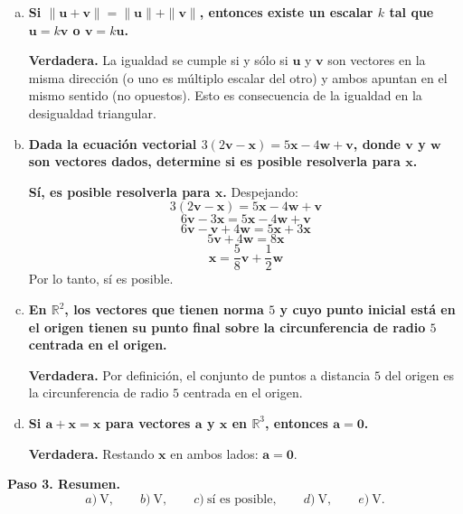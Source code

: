 \begin{prob}
\begin{myproof}
\begin{enumerate}[a)]
\item \textbf{Si $\|\mathbf{u}+\mathbf{v}\|=\|\mathbf{u}\|+\|\mathbf{v}\|$, entonces existe un escalar $k$ tal que $\mathbf{u}=k\mathbf{v}$ o $\mathbf{v}=k\mathbf{u}$.}

\textbf{Verdadera.}  
La igualdad se cumple si y sólo si $\mathbf{u}$ y $\mathbf{v}$ son vectores en la misma dirección (o uno es múltiplo escalar del otro) y ambos apuntan en el mismo sentido (no opuestos).  
Esto es consecuencia de la igualdad en la desigualdad triangular.

\item \textbf{Dada la ecuación vectorial $3(2\mathbf{v}-\mathbf{x})=5\mathbf{x}-4\mathbf{w}+\mathbf{v}$, donde $\mathbf{v}$ y $\mathbf{w}$ son vectores dados, determine si es posible resolverla para $\mathbf{x}$.}

\textbf{Sí, es posible resolverla para $\mathbf{x}$.}  
Despejando:
\[
3(2\mathbf{v}-\mathbf{x}) = 5\mathbf{x} - 4\mathbf{w} + \mathbf{v}
\]
\[
6\mathbf{v} - 3\mathbf{x} = 5\mathbf{x} - 4\mathbf{w} + \mathbf{v}
\]
\[
6\mathbf{v} - \mathbf{v} + 4\mathbf{w} = 5\mathbf{x} + 3\mathbf{x}
\]
\[
5\mathbf{v} + 4\mathbf{w} = 8\mathbf{x}
\]
\[
\mathbf{x} = \frac{5}{8}\mathbf{v} + \frac{1}{2}\mathbf{w}
\]
Por lo tanto, sí es posible.

\item \textbf{En $\mathbb{R}^2$, los vectores que tienen norma $5$ y cuyo punto inicial está en el origen tienen su punto final sobre la circunferencia de radio $5$ centrada en el origen.}

\textbf{Verdadera.}  
Por definición, el conjunto de puntos a distancia $5$ del origen es la circunferencia de radio $5$ centrada en el origen.

\item \textbf{Si $\mathbf{a}+\mathbf{x}=\mathbf{x}$ para vectores $\mathbf{a}$ y $\mathbf{x}$ en $\mathbb{R}^3$, entonces $\mathbf{a}=\mathbf{0}$.}

\textbf{Verdadera.}  
Restando $\mathbf{x}$ en ambos lados: $\mathbf{a} = \mathbf{0}$.
\end{enumerate}

\textbf{Paso 3. Resumen.}
\[
\boxed{a)\ \text{V},\qquad b)\ \text{V},\qquad c)\ \text{sí es posible},\qquad d)\ \text{V},\qquad e)\ \text{V}.}
\]
\end{myproof}

\end{prob}

